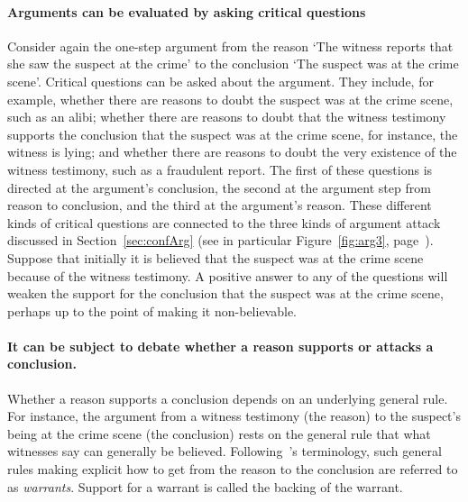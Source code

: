 \documentclass[10pt]{article}
\begin{document}


\paragraph{Arguments can be evaluated by asking critical questions} %
Consider again the one-step argument from the reason `The witness reports that she saw the suspect at the crime' to the conclusion `The suspect was at the crime scene'. 
Critical questions can be asked about the argument. They include, for example, whether there are reasons to doubt the suspect was at the crime scene, such as an alibi; whether there 
are reasons to doubt that the witness testimony supports the conclusion that the suspect was at the crime scene, for instance, the witness is lying; and whether there are 
reasons to doubt the very existence of the witness testimony, such as a fraudulent report. The first of these questions is directed at the argument's conclusion, the second at the argument step from reason to conclusion, and the third at the argument's reason. These different kinds of critical questions are connected to the three kinds of argument attack discussed in Section~\ref{sec:confArg} (see in particular Figure~\ref{fig:arg3}, page~\pageref{fig:arg3}). 
Suppose that initially it is believed that the suspect was at the crime scene because of the witness testimony. A positive answer to any of the questions will weaken the support for the conclusion that the suspect was at the crime scene, perhaps up to the point of making it non-believable.

\paragraph{It can be subject to debate whether a reason supports or attacks a conclusion.} 
Whether a reason supports a conclusion depends on an underlying general rule. For instance, the argument from a witness testimony (the reason) to the suspect's being at the crime scene (the conclusion) rests on the general rule that what witnesses say can generally be believed. Following~\cite{toulmin1958}'s terminology, such general rules making explicit how to get from the reason to the conclusion are referred to as \textit{warrants}. Support for a warrant is called the backing of the warrant.
\end{document}
